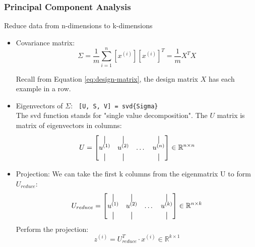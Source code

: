     \subsubsection{Principal Component Analysis}
    Reduce data from n-dimensions to k-dimensions
        \begin{itemize}
            \item Covariance matrix:
                \[
                    \Sigma = \frac{1}{m} \sum_{i=1}^{n} [x^{(i)}][x^{(i)}]^T = \frac{1}{m} X^T X 
                \]

                Recall from Equation \ref{eq:design-matrix}, the design matrix $X$ has each example in a row.

            \item Eigenvectors of $\Sigma$: \verb| [U, S, V] = svd{Sigma}| \\
                  The svd function stands for "single value decomposition". The $U$ matrix is matrix of eigenvectors in columns: 
                  \[
                    U    = \begin{bmatrix}
                    \vertbar    &  \vertbar     &        &     \vertbar \\
                    u^{(1)}     &  u^{(2)}      &  \dots &     u^{(n)}  \\ 
                    \vertbar    &  \vertbar     &        &     \vertbar \\
                           \end{bmatrix}   \in \mathbb{R} ^{n \times n}
                  \] 
              \item Projection: We can take the first k columns from the eigenmatrix U to form $U_{reduce}$:
                  \[
                      U_{reduce}  = \begin{bmatrix}
                        \vertbar    &  \vertbar     &        &     \vertbar \\
                        u^{(1)}     &  u^{(2)}      &  \dots &     u^{(k)}  \\ 
                        \vertbar    &  \vertbar     &        &     \vertbar \\
                                    \end{bmatrix}   \in \mathbb{R} ^{n \times k}
                  \] 
                  Perform the projection:
                  \begin{equation}
                      z^{(i)} = U^T_{reduce} \cdot x^{(i)} \in \mathbb{R}^{k \times 1}
                      \label{eq:pca-projection}
                  \end{equation} 
        \end{itemize}

